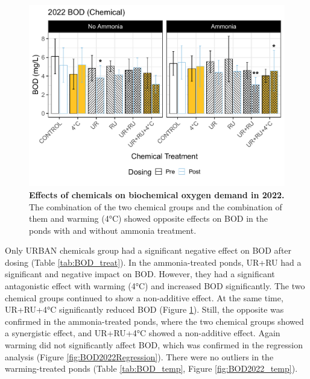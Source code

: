 \documentclass[11pt, a4paper]{article}
\begin{document}
\begin{spacing}{1.5}
\begin{figure}[H]
    \centering
    \includegraphics[scale=0.55]{./Figures/BOD2022_bar_chem}
    \caption{\textbf{Effects of chemicals on biochemical oxygen demand in 2022.} The combination of the two chemical groups and the combination of them and warming (4°C) showed opposite effects on BOD in the ponds with and without ammonia treatment.}
    \label{fig:BOD2022cp}
\end{figure}

Only URBAN chemicals group had a significant negative effect on BOD after dosing (Table \ref{tab:BOD_treat}). In the ammonia-treated ponds, UR+RU had a significant and negative impact on BOD. However, they had a significant antagonistic effect with warming (4°C) and increased BOD significantly. The two chemical groups continued to show a non-additive effect. At the same time, UR+RU+4°C significantly reduced BOD (Figure \ref{fig:BOD2022cp}). Still, the opposite was confirmed in the ammonia-treated ponds, where the two chemical groups showed a synergistic effect, and UR+RU+4°C showed a non-additive effect. Again warming did not significantly affect BOD, which was confirmed in the regression analysis (Figure \ref{fig:BOD2022Regression}). There were no outliers in the warming-treated ponds (Table \ref{tab:BOD_temp}, Figure \ref{fig:BOD2022_temp}).


\end{spacing}
\end{document}
